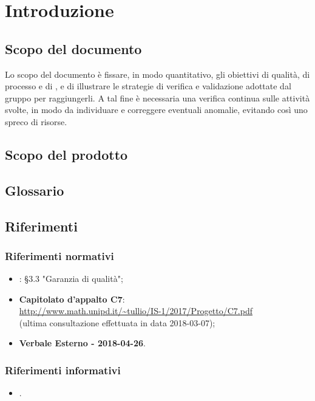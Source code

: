 \section{Introduzione} \label{introduzione}

\subsection{Scopo del documento}
Lo scopo del documento è fissare, in modo quantitativo, gli obiettivi di qualità, di processo e di ,
e di illustrare le strategie di verifica e validazione adottate dal gruppo \GroupName{} per raggiungerli.
A tal fine è necessaria una verifica continua sulle attività svolte, in modo da individuare e correggere eventuali anomalie,
evitando così uno spreco di risorse.

\subsection{Scopo del prodotto}

\ScopoProdotto{}

\subsection{Glossario}
\DescrizioneGlossario{}

\subsection{Riferimenti}
\subsubsection{Riferimenti normativi}
\begin{itemize}
	\item \textbf{\vNormeDiProgetto{}}: §3.3 "Garanzia di qualità";
	\item \textbf{Capitolato d'appalto C7}:\\
		\url{http://www.math.unipd.it/~tullio/IS-1/2017/Progetto/C7.pdf}\\
		(ultima consultazione effettuata in data 2018-03-07);
	\item \textbf{Verbale Esterno - 2018-04-26}.
\end{itemize}

\subsubsection{Riferimenti informativi}
	\begin{itemize}
		\item\textbf{\vPianoDiProgetto{}}.

	\end{itemize}
